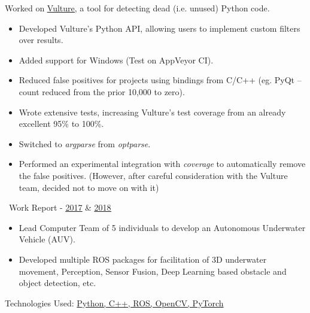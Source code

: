 \documentclass[10pt,a4paper,ragged2e]{altacv}
\begin{document}
Worked on \href{https://github.com/jendrikseipp/vulture}{\underline{Vulture}}, a tool for detecting dead (i.e. unused) Python code.
\begin{itemize}
    \item Developed Vulture's Python API, allowing users to implement custom filters over results.
    \item Added support for Windows (Test on AppVeyor CI).
    \item Reduced false positives for projects using bindings from C/C++ (eg. PyQt -- count reduced from the prior 10,000 to zero).
    \item Wrote extensive tests, increasing Vulture's test coverage from an already excellent 95\% to 100\%.
    \item Switched to \textit{argparse} from \textit{optparse}.
    \item Performed an experimental integration with \textit{coverage} to automatically remove the false positives. (However, after careful consideration with the Vulture team, decided not to move on with it)
\end{itemize}

\faChain \, Work Report - \href{https://tinyurl.com/rahul-gsoc-2017}{\underline{2017}} \& \href{https://summerofcode.withgoogle.com/archive/2018/projects/6524402275450880}{\underline{2018}}



\begin{itemize}
    \item Lead Computer Team of 5 individuals to develop an Autonomous Underwater Vehicle (AUV).
    \item Developed multiple ROS packages for facilitation of 3D underwater movement, Perception, Sensor Fusion, Deep Learning based obstacle and object detection, etc.
\end{itemize}
Technologies Used: \underline{Python, C++, ROS, OpenCV, PyTorch}

\divider

\end{document}
